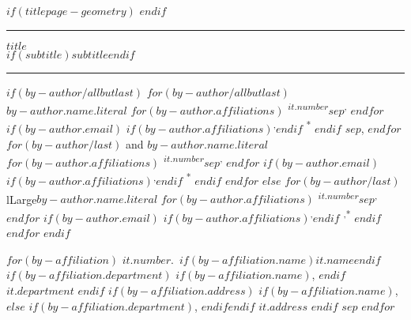 
$if(titlepage-geometry)$
$endif$
\begin{minipage}[b][\textheight][s]{\textwidth}

\par\noindent\rule{\textwidth}{0.4pt}

\begin{center}
{\huge\nohyphens{$title$}}\\[1\baselineskip] 
$if(subtitle)${\large{$subtitle$}}\baselineskip$endif$
\end{center}

\par\noindent\rule{\textwidth}{0.4pt}

\vfill 
$if(by-author/allbutlast)$%
$for(by-author/allbutlast)$%
{\large{$by-author.name.literal$}}%
$for(by-author.affiliations)$%
{\textsuperscript{$it.number$}}$sep$\textsuperscript{,}%
$endfor$%
$if(by-author.email)$%
$if(by-author.affiliations)$\textsuperscript{,}$endif$%
{\textsuperscript{*}}%
$endif$%
$sep$, %
$endfor$%
$for(by-author/last)$%
{ and {$by-author.name.literal$}}%
$for(by-author.affiliations)$%
{\textsuperscript{$it.number$}}$sep$\textsuperscript{,}%
$endfor$%
$if(by-author.email)$%
$if(by-author.affiliations)$\textsuperscript{,}$endif$%
{\textsuperscript{*}}%
$endif$%
$endfor$%
$else$%
$for(by-author/last)$%
{lLarge{$by-author.name.literal$}}%
$for(by-author.affiliations)$%
{\textsuperscript{$it.number$}}$sep$\textsuperscript{,}$endfor$%
$if(by-author.email)$%
$if(by-author.affiliations)$\textsuperscript{,}$endif$%
{\textsuperscript{,*}}%
$endif$%
$endfor$%
$endif$

\vfill

$for(by-affiliation)$%
{$it.number$}.~$if(by-affiliation.name)${$it.name$}$endif$%
$if(by-affiliation.department)$%
$if(by-affiliation.name)$, $endif$%
{$it.department$}%
$endif$%
$if(by-affiliation.address)$%
$if(by-affiliation.name)$, $else$%
$if(by-affiliation.department)$, $endif$$endif$%
{$it.address$}%
$endif$%
$sep$
$endfor$

\vspace{1\baselineskip} 


\end{minipage}
